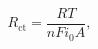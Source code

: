 \documentclass[preview]{standalone}
\begin{document}
\[R_\text{ct} = \frac{RT}{n F i_0 A},\]
\end{document}
